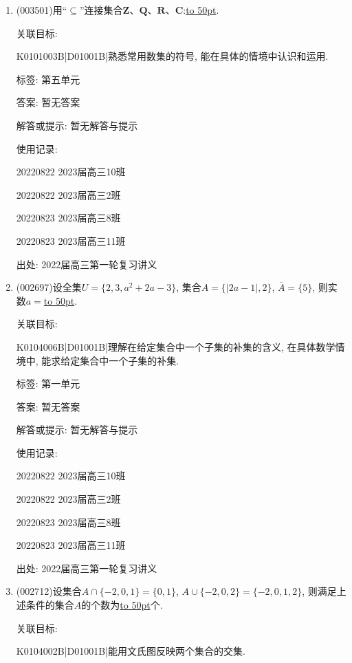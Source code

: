 \documentclass[10pt,a4paper]{article}
\newcommand{\blank}[1]{\underline{\hbox to #1pt{}}}
\begin{document}
\begin{enumerate}[1.]

\item { (003501)}用``$\subseteq$''连接集合$\mathbf{Z}$、$\mathbf{Q}$、$\mathbf{R}$、$\mathbf{C}$:\blank{50}.


关联目标:

K0101003B|D01001B|熟悉常用数集的符号, 能在具体的情境中认识和运用.



标签: 第五单元

答案: 暂无答案

解答或提示: 暂无解答与提示

使用记录:

20220822	2023届高三10班	

20220822	2023届高三2班	

20220823	2023届高三8班	

20220823	2023届高三11班	


出处: 2022届高三第一轮复习讲义
\item { (002697)}设全集$U=\{2,3,a^2+2a-3\}$, 集合$A=\{|2a-1|,2\}$, $\overline A=\{5\}$, 则实数$a=$\blank{50}.


关联目标:

K0104006B|D01001B|理解在给定集合中一个子集的补集的含义, 在具体数学情境中, 能求给定集合中一个子集的补集.



标签: 第一单元

答案: 暂无答案

解答或提示: 暂无解答与提示

使用记录:

20220822	2023届高三10班	

20220822	2023届高三2班	

20220823	2023届高三8班	

20220823	2023届高三11班	


出处: 2022届高三第一轮复习讲义
\item { (002712)}设集合$A\cap \{-2,0,1\}=\{0,1\}$, $A\cup \{-2,0,2\}=\{-2,0,1,2\}$, 则满足上述条件的集合$A$的个数为\blank{50}个.


关联目标:

K0104002B|D01001B|能用文氏图反映两个集合的交集.


\end{enumerate}
\end{document}
